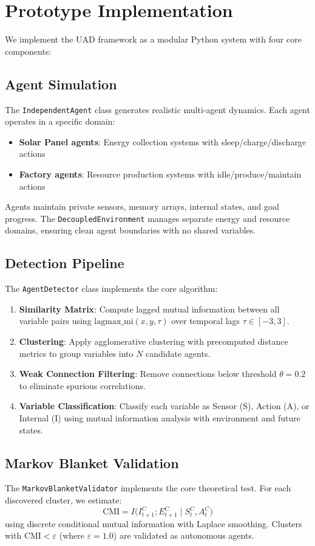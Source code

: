 \documentclass[10pt,conference]{IEEEtran}
\begin{document}
\section{Prototype Implementation}
We implement the UAD framework as a modular Python system with four core components:

\subsection{Agent Simulation}
The \texttt{IndependentAgent} class generates realistic multi-agent dynamics. Each agent operates in a specific domain:
\begin{itemize}
  \item \textbf{Solar Panel agents}: Energy collection systems with sleep/charge/discharge actions
  \item \textbf{Factory agents}: Resource production systems with idle/produce/maintain actions
\end{itemize}

Agents maintain private sensors, memory arrays, internal states, and goal progress. The \texttt{DecoupledEnvironment} manages separate energy and resource domains, ensuring clean agent boundaries with no shared variables.

\subsection{Detection Pipeline}
The \texttt{AgentDetector} class implements the core algorithm:
\begin{enumerate}
  \item \textbf{Similarity Matrix}: Compute lagged mutual information between all variable pairs using $\mathrm{lagmax\_mi}(x,y,\tau)$ over temporal lags $\tau \in [-3,3]$.
  \item \textbf{Clustering}: Apply agglomerative clustering with precomputed distance metrics to group variables into $N$ candidate agents.
  \item \textbf{Weak Connection Filtering}: Remove connections below threshold $\theta=0.2$ to eliminate spurious correlations.
  \item \textbf{Variable Classification}: Classify each variable as Sensor (S), Action (A), or Internal (I) using mutual information analysis with environment and future states.
\end{enumerate}

\subsection{Markov Blanket Validation}
The \texttt{MarkovBlanketValidator} implements the core theoretical test. For each discovered cluster, we estimate:
\[
\mathrm{CMI} = I\bigl(I^C_{t+1};E^C_{t+1}\mid S^C_t,A^C_t\bigr)
\]
using discrete conditional mutual information with Laplace smoothing. Clusters with $\mathrm{CMI} < \varepsilon$ (where $\varepsilon=1.0$) are validated as autonomous agents.
\end{document}
